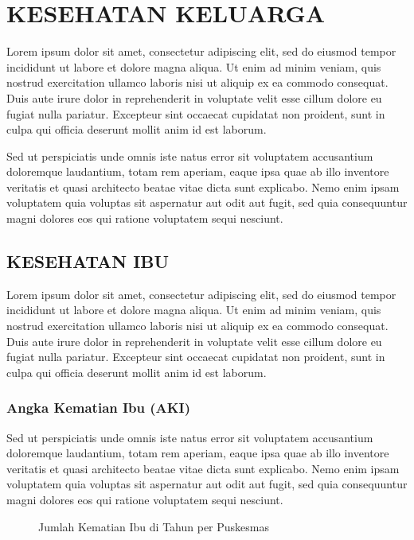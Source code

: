 \chapter{KESEHATAN KELUARGA}
Lorem ipsum dolor sit amet, consectetur adipiscing elit, sed do eiusmod tempor incididunt ut labore et dolore magna aliqua. Ut enim ad minim veniam, quis nostrud exercitation ullamco laboris nisi ut aliquip ex ea commodo consequat. Duis aute irure dolor in reprehenderit in voluptate velit esse cillum dolore eu fugiat nulla pariatur. Excepteur sint occaecat cupidatat non proident, sunt in culpa qui officia deserunt mollit anim id est laborum.

Sed ut perspiciatis unde omnis iste natus error sit voluptatem accusantium doloremque laudantium, totam rem aperiam, eaque ipsa quae ab illo inventore veritatis et quasi architecto beatae vitae dicta sunt explicabo. Nemo enim ipsam voluptatem quia voluptas sit aspernatur aut odit aut fugit, sed quia consequuntur magni dolores eos qui ratione voluptatem sequi nesciunt.

\section{KESEHATAN IBU}
Lorem ipsum dolor sit amet, consectetur adipiscing elit, sed do eiusmod tempor incididunt ut labore et dolore magna aliqua. Ut enim ad minim veniam, quis nostrud exercitation ullamco laboris nisi ut aliquip ex ea commodo consequat. Duis aute irure dolor in reprehenderit in voluptate velit esse cillum dolore eu fugiat nulla pariatur. Excepteur sint occaecat cupidatat non proident, sunt in culpa qui officia deserunt mollit anim id est laborum.

\subsection{Angka Kematian Ibu (AKI)}
Sed ut perspiciatis unde omnis iste natus error sit voluptatem accusantium doloremque laudantium, totam rem aperiam, eaque ipsa quae ab illo inventore veritatis et quasi architecto beatae vitae dicta sunt explicabo. Nemo enim ipsam voluptatem quia voluptas sit aspernatur aut odit aut fugit, sed quia consequuntur magni dolores eos qui ratione voluptatem sequi nesciunt.

\begin{figure}[H]
    \centering{}
    \caption{Jumlah Kematian Ibu di \namaKabupaten Tahun \tP per Puskesmas}
    \label{fig:Jumlah-Kematian-Ibu}
\end{figure}


